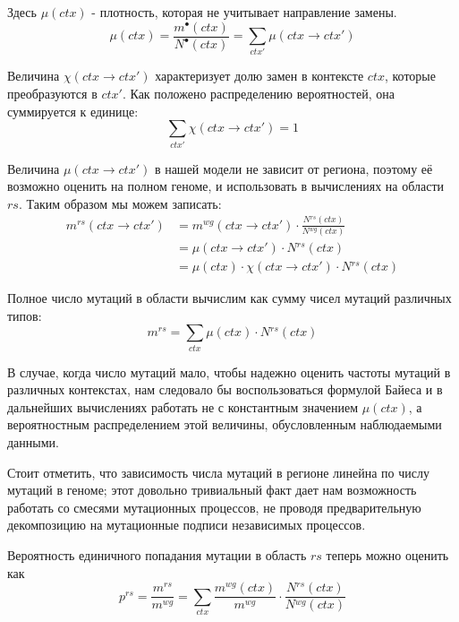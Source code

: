 \documentclass[a4paper]{article}
\newcommand\wg{{}^{wg}}
\newcommand\rs{{}^{rs}}
\newcommand\sumctx{\sum_{ctx}}
\newcommand\dirctx{ctx\to ctx'}
\newcommand\sumdir{\sum_{ctx'}}
\begin{document}
\noindent Здесь $\mu(ctx)$ - плотность, которая не учитывает направление замены.
\begin{equation*}
	\mu(ctx) = \frac{m^{\bullet}(ctx)}{N^{\bullet}(ctx)} = \sumdir \mu(\dirctx)
\end{equation*}

Величина $\chi(\dirctx)$ характеризует долю замен в контексте $ctx$, которые преобразуются в $ctx'$. Как положено распределению вероятностей, она суммируется к единице:
\begin{equation*}
	\sum_{ctx'}\chi(\dirctx) = 1
\end{equation*}

Величина $\mu(\dirctx)$ в нашей модели не зависит от региона, поэтому её возможно оценить на полном геноме, и использовать в вычислениях на области $rs$. Таким образом мы можем записать:
\begin{equation}\label{mutations-in-region}
\begin{split}
	m\rs(\dirctx) &= m\wg(\dirctx)\cdot\frac{N\rs(ctx)}{N\wg(ctx)}\\
				  &= \mu(\dirctx)\cdot N\rs(ctx)\\
				  &= \mu(ctx)\cdot\chi(\dirctx)\cdot N\rs(ctx)
\end{split}
\end{equation}

Полное число мутаций в области вычислим как сумму чисел мутаций различных типов:
\begin{equation}\label{mutations-total}
	m\rs = \sumctx\mu(ctx)\cdot N\rs(ctx)
\end{equation}

В случае, когда число мутаций мало, чтобы надежно оценить частоты мутаций в различных контекстах, нам следовало бы воспользоваться формулой Байеса и в дальнейших вычислениях работать не с константным значением $\mu(ctx)$, а вероятностным распределением этой величины, обусловленным наблюдаемыми данными.

Стоит отметить, что зависимость числа мутаций в регионе линейна по числу мутаций в геноме; этот довольно тривиальный факт дает нам возможность работать со смесями мутационных процессов, не проводя предварительную декомпозицию на мутационные подписи независимых процессов.

Вероятность единичного попадания мутации в область $rs$ теперь можно оценить как
\begin{equation}
	p\rs = \frac{m\rs}{m\wg} = \sumctx \frac{m\wg(ctx)}{m\wg}\cdot\frac{N\rs(ctx)}{N\wg(ctx)}
\end{equation}
\end{document}
